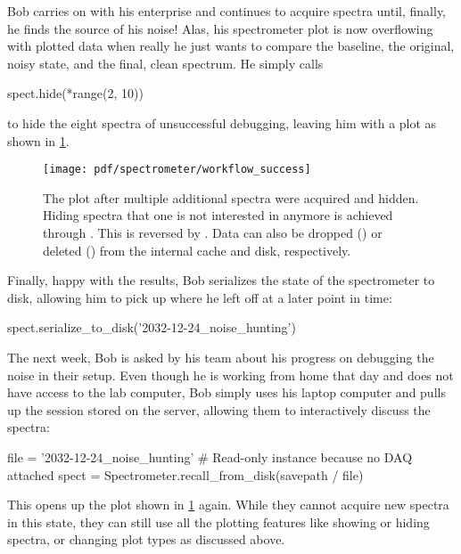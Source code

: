 Bob carries on with his enterprise and continues to acquire spectra until, finally, he finds the source of his noise!
Alas, his spectrometer plot is now overflowing with plotted data when really he just wants to compare the baseline, the original, noisy state, and the final, clean spectrum.
He simply calls
\begin{py}
    spect.hide(*range(2, 10))
\end{py}
to hide the eight spectra of unsuccessful debugging, leaving him with a plot as shown in \cref{fig:speck:software:workflow:success}.

\begin{figure}
    \centering
    \texttt{[image: pdf/spectrometer/workflow\_success]}
    \caption{
        The \pyspeck plot after multiple additional spectra were acquired and hidden.
        Hiding spectra that one is not interested in anymore is achieved through .
        This is reversed by .
        Data can also be dropped () or deleted () from the internal cache and disk, respectively.
    }
    \label{fig:speck:software:workflow:success}
\end{figure}

Finally, happy with the results, Bob serializes the state of the spectrometer to disk, allowing him to pick up where he left off at a later point in time:
\begin{py}
    spect.serialize_to_disk('2032-12-24_noise_hunting')
\end{py}
The next week, Bob is asked by his team about his progress on debugging the noise in their setup.
Even though he is working from home that day and does not have access to the lab computer, Bob simply uses his laptop computer and pulls up the  session stored on the server, allowing them to interactively discuss the spectra:
\begin{py}
    file = '2032-12-24_noise_hunting'
    # Read-only instance because no DAQ attached
    spect = Spectrometer.recall_from_disk(savepath / file)
\end{py}
This opens up the plot shown in \cref{fig:speck:software:workflow:success} again.
While they cannot acquire new spectra in this state,
they can still use all the plotting features like showing or hiding spectra, or changing plot types as discussed above.

